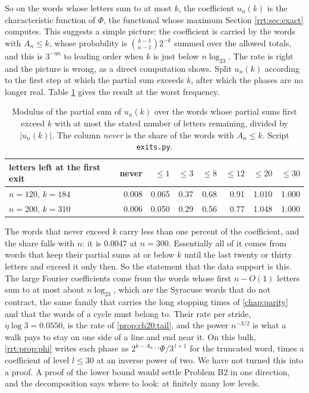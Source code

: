 So on the words whose letters sum to at most $k$, the coefficient $u_n(k)$ is the characteristic function of $\Phi$, the functional whose maximum Section \ref{rrt:sec:exact} computes. This suggests a simple picture: the coefficient is carried by the words with $A_n\le k$, whose probability is $\binom{k-1}{n-1}2^{-k}$ summed over the allowed totals, and this is $3^{-\eta n}$ to leading order when $k$ is just below $n\log_23$. The rate is right and the picture is wrong, as a direct computation shows. Split $u_n(k)$ according to the first step at which the partial sum exceeds $k$, after which the phases are no longer real. Table \ref{rrt:tab:exit} gives the result at the worst frequency.

\begin{table}[t]
\centering
\small
\begin{tabular}{lrrrrrrr}
\toprule
letters left at the first exit & never & $\le1$ & $\le3$ & $\le8$ & $\le12$ & $\le20$ & $\le30$\\
\midrule
$n=120$, $k=184$ & 0.008 & 0.065 & 0.37 & 0.68 & 0.91 & 1.010 & 1.000\\
$n=200$, $k=310$ & 0.006 & 0.050 & 0.29 & 0.56 & 0.77 & 1.048 & 1.000\\
\bottomrule
\end{tabular}
\caption{Modulus of the partial sum of $u_n(k)$ over the words whose partial sums first exceed $k$ with at most the stated number of letters remaining, divided by $|u_n(k)|$. The column \emph{never} is the share of the words with $A_n\le k$. Script \texttt{exits.py}.}
\label{rrt:tab:exit}
\end{table}

The words that never exceed $k$ carry less than one percent of the coefficient, and the share falls with $n$: it is $0.0047$ at $n=300$. Essentially all of it comes from words that keep their partial sums at or below $k$ until the last twenty or thirty letters and exceed it only then. So the statement that the data support is this. The large Fourier coefficients come from the words whose first $n-O(1)$ letters sum to at most about $n\log_23$, which are the Syracuse words that do not contract, the same family that carries the long stopping times of \cref{chap:parity} and that the words of a cycle must belong to. Their rate per stride, $\eta\log3=0.0550$, is the rate of \cref{prop:ch20:tail}, and the power $n^{-3/2}$ is what a walk pays to stay on one side of a line and end near it. On this bulk, \cref{rrt:prop:phi} writes each phase as $2^{k-A_{n-l}}\Phi/3^{\,l+1}$ for the truncated word, times a coefficient of level $l\le30$ at an inverse power of two. We have not turned this into a proof. A proof of the lower bound would settle Problem B2 in one direction, and the decomposition says where to look: at finitely many low levels.

